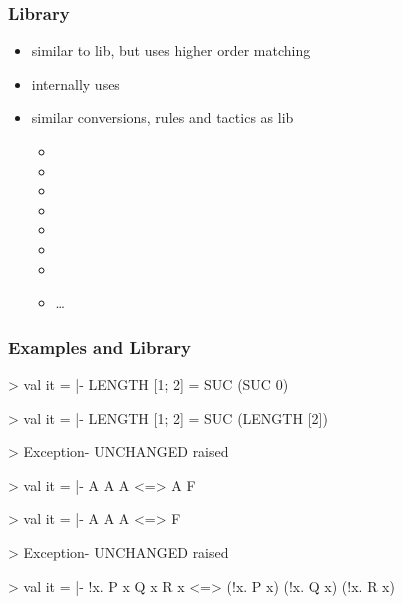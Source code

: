 \begin{frame}
\frametitle{ Library}

\begin{itemize}
\item similar to  lib, but uses higher order matching
\item internally uses 
\item similar conversions, rules and tactics as  lib
\begin{itemize}
\item {}
\item {}
\item {}
\item {}
\item {}
\item {}
\item {}
\item \ldots
\end{itemize}
\end{itemize}
\end{frame}



\begin{frame}[fragile]
\frametitle{Examples  and  Library}

\begin{semiverbatim}\scriptsize
>  
val it = |- LENGTH [1; 2] = SUC (SUC 0)

>  
val it = |- LENGTH [1; 2] = SUC (LENGTH [2])

>  
Exception- UNCHANGED raised

>  
val it = |- A \holAnd{} A \holAnd{} \holNeg{}A <=> A \holAnd{} F

>  
val it = |- A \holAnd{} A \holAnd{} \holNeg{}A <=> F

>  
Exception- UNCHANGED raised

>  
val it = |- !x. P x \holAnd{} Q x \holAnd{} R x <=> (!x. P x) \holAnd{} (!x. Q x) \holAnd{} (!x. R x)
\end{semiverbatim}
\end{frame}


